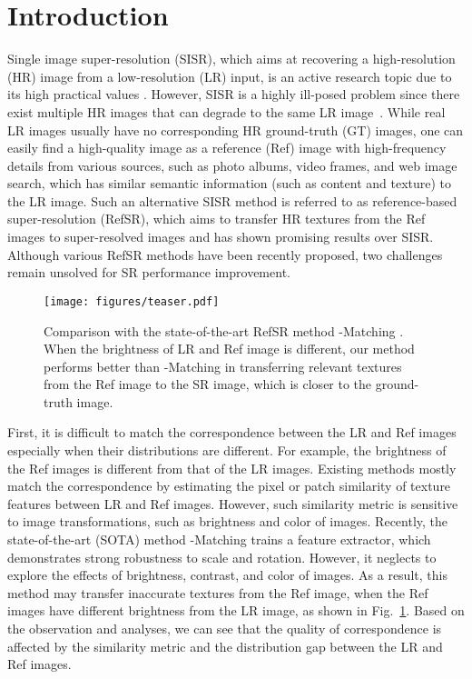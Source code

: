 \documentclass[runningheads]{llncs}
\begin{document}
\section{Introduction}
Single image super-resolution (SISR), which aims at recovering a high-resolution (HR) image from a low-resolution (LR) input, is an active research topic due to its high practical values
\cite{Jo_2021_CVPR,zhang2018ffdnet,li2019SRFBN,kai2021bsrgan,Wang_2021_CVPR,Khrulkov_2021_CVPR,Xing_2021_CVPR,liang2021mutual,Kong_2021_CVPR,Kar_2021_CVPR,guo2020hierarchical,liang2021hierarchical}.
However, SISR is a highly ill-posed problem since there exist multiple HR images that can degrade to the same LR image~\cite{ulyanov2018deep,guo2020drn}.
While real LR images usually have no corresponding HR ground-truth (GT) images, one can easily find a high-quality image as a reference (Ref) image with high-frequency details from various sources, such as photo albums, video frames, and web image search, which has similar semantic information (such as content and texture) to the LR image. 
Such an alternative SISR method is referred to as reference-based super-resolution (RefSR), which aims to transfer HR textures from the Ref images to super-resolved images and has shown promising results over SISR. 
Although various RefSR methods \cite{jiang2021robust,lu2021masa,yantowards,xie2020feature} have been recently proposed, two challenges remain unsolved for SR performance improvement. 

\begin{figure}[t]
\setlength\belowcaptionskip{-5pt}
\centering
\texttt{[image: figures/teaser.pdf]}
\caption{Comparison with the state-of-the-art RefSR method -Matching \cite{jiang2021robust}. When the brightness of LR and Ref image is different, our method performs better than -Matching \cite{jiang2021robust} in transferring relevant textures from the Ref image to the SR image, which is closer to the ground-truth image. 
}
\label{fig:teaser}
\end{figure}


First, it is difficult to match the correspondence between the LR and Ref images especially when their distributions are different. 
For example, the brightness of the Ref images is different from that of the LR images.
Existing methods \cite{zhang2019image,yang2020learning} mostly match the correspondence by estimating the pixel or patch similarity of texture features between LR and Ref images.
However, such similarity metric is sensitive to image transformations, such as brightness and color of images.
Recently, the state-of-the-art (SOTA) method -Matching \cite{jiang2021robust} 
trains a feature extractor, which demonstrates strong robustness to scale and rotation. 
However, it neglects to explore the effects of brightness, contrast, and color of images.
As a result, this method may transfer inaccurate textures from the Ref image, when the Ref images have different brightness from the LR image, as shown in Fig.~\ref{fig:teaser}. 
Based on the observation and analyses, we can see that the quality of correspondence is affected by the similarity metric and the distribution gap between the LR and Ref images.
\end{document}
